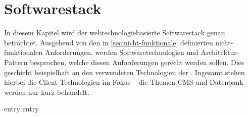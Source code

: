 \chapter{Softwarestack}
\label{chap:softwarestack}

In diesem Kapitel wird der webtechnologiebasierte Softwarestack genau betrachtet.
Ausgehend von den in \autoref{sec:nicht-funktionale} definierten nicht-funktionalen
Anforderungen, werden Softwaretechnologien und Architektur-Pattern besprochen, 
welche diesen Anforderungen gerecht werden sollen. Dies geschieht beispielhaft
an den verwendeten Technologien der \shst{}. Ingesamt stehen hierbei die
Client-Technologien im Fokus -- die Themen CMS und Datenbank werden nur kurz behandelt.

{entry}
{entry}